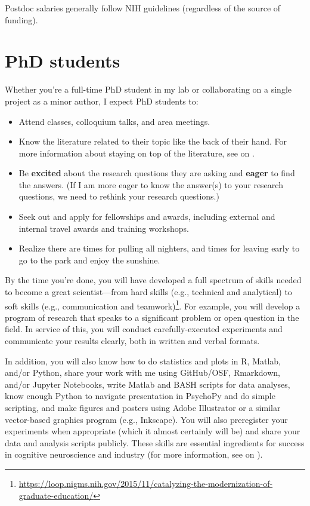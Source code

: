 \documentclass[letterpaper,12pt,oneside]{memoir}
\begin{document}
Postdoc salaries generally follow NIH guidelines (regardless of the source of funding).


\section{PhD students}

Whether you're a full-time PhD student in my lab or collaborating on a single project as a minor author, I expect PhD students to:

\begin{itemize}
\item Attend classes, colloquium talks, and area meetings.
\item Know the literature related to their topic like the back of their hand. For more information about staying on top of the literature, see  on .
\item Be \textbf{excited} about the research questions they are asking and \textbf{eager} to find the answers. (If I am more eager to know the answer(s) to your research questions, we need to rethink your research questions.)
\item Seek out and apply for fellowships and awards, including external and internal travel awards and training workshops.
\item Realize there are times for pulling all nighters, and times for leaving early to go to the park and enjoy the sunshine.
\end{itemize}

By the time you're done, you will have developed a full spectrum of skills needed to become a great scientist---from hard skills (e.g., technical and analytical) to soft skills (e.g., communication and teamwork)\footnote{\url{https://loop.nigms.nih.gov/2015/11/catalyzing-the-modernization-of-graduate-education/}}. For example, you will develop a program of research that speaks to a significant problem or open question in the field. In service of this, you will conduct carefully-executed experiments and communicate your results clearly, both in written and verbal formats. 

In addition, you will also know how to do statistics and plots in R, Matlab, and/or Python, share your work with me using GitHub/OSF, Rmarkdown, and/or Jupyter Notebooks, write Matlab and BASH scripts for data analyses, know enough Python to navigate presentation in PsychoPy and do simple scripting, and make figures and posters using Adobe Illustrator or a similar vector-based graphics program (e.g., Inkscape). You will also preregister your experiments when appropriate (which it almost certainly will be) and share your data and analysis scripts publicly. These skills are essential ingredients for success in cognitive neuroscience and industry (for more information, see  on ).
\end{document}

